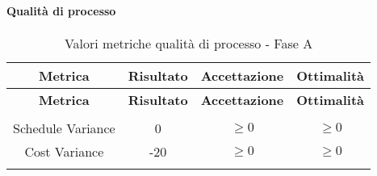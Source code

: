 \paragraph{Qualità di processo}
\begin{longtable}{|c|c|c|c|}
	\hline \multicolumn{1}{|c|}{\textbf{Metrica}} & \multicolumn{1}{c|}{\textbf{Risultato}} & \multicolumn{1}{c|}{\textbf{Accettazione}} & \multicolumn{1}{c|}{\textbf{Ottimalità}} \\ 
	\hline 
	\endfirsthead
	
	\hline \multicolumn{1}{|c|}{\textbf{Metrica}} & \multicolumn{1}{c|}{\textbf{Risultato}} & \multicolumn{1}{c|}{\textbf{Accettazione}} & \multicolumn{1}{c|}{\textbf{Ottimalità}} \\ 
	\hline 
	\endhead
	
	\hline \multicolumn{4}{|r|}{\ToBeContinued} \\ 
	\hline
	\endfoot
	
	\hline
	\endlastfoot
	
	\hline Schedule Variance & 0 & $\geq 0$ & $\geq 0$ \\
	\hline Cost Variance & -20 & $\geq 0$ & $\geq 0$ \\
	\hline
	\caption{Valori metriche qualità di processo - Fase A}
\end{longtable}

